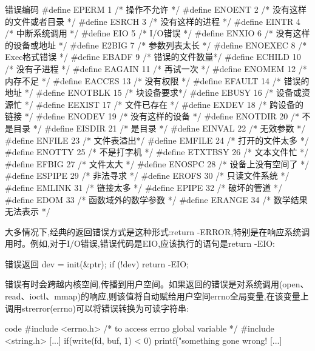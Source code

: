 \documentclass[lang=cn,newtx,10pt,scheme=chinese]{elegantbook}
\begin{document}
\begin{mycode}{错误编码}
#define  EPERM       1    /* 操作不允许 */
#define  ENOENT      2    /* 没有这样的文件或者目录 */
#define  ESRCH       3    /* 没有这样的进程 */
#define  EINTR       4    /* 中断系统调用 */
#define  EIO         5    /* I/O错误 */
#define  ENXIO       6    /* 没有这样的设备或地址 */
#define  E2BIG       7    /* 参数列表太长 */
#define  ENOEXEC     8    /* Exec格式错误 */
#define  EBADF       9    /* 错误的文件数量*/
#define  ECHILD      10   /* 没有子进程 */
#define  EAGAIN      11   /* 再试一次 */
#define  ENOMEM      12   /* 内存不足 */
#define  EACCES      13   /* 没有权限 */
#define  EFAULT      14   /* 错误的地址 */
#define  ENOTBLK     15   /* 块设备要求*/
#define  EBUSY       16   /* 设备或资源忙 */
#define  EEXIST      17   /* 文件已存在 */
#define  EXDEV       18   /* 跨设备的链接 */
#define  ENODEV      19   /* 没有这样的设备 */
#define  ENOTDIR     20   /* 不是目录 */
#define  EISDIR      21   /* 是目录 */
#define  EINVAL      22   /* 无效参数 */
#define  ENFILE      23   /* 文件表溢出*/
#define  EMFILE      24   /* 打开的文件太多 */
#define  ENOTTY      25   /* 不是打字机 */
#define  ETXTBSY     26   /* 文本文件忙 */
#define  EFBIG       27   /* 文件太大 */
#define  ENOSPC      28   /* 设备上没有空间了 */
#define  ESPIPE      29   /* 非法寻求 */
#define  EROFS       30   /* 只读文件系统 */
#define  EMLINK      31   /* 链接太多 */
#define  EPIPE       32   /* 破坏的管道 */
#define  EDOM        33   /* 函数域外的数学参数 */
#define  ERANGE      34   /* 数学结果无法表示 */
\end{mycode}

大多情况下,经典的返回错误方式是这种形式:return -ERROR,特别是在响应系统调用时。例如,对于I/O错误,错误代码是EIO,应该执行的语句是return -EIO:

\begin{mycode}{错误返回}
dev = init(&ptr);
if (!dev)
    return -EIO;
\end{mycode}

错误有时会跨越内核空间,传播到用户空间。如果返回的错误是对系统调用(open、read、ioctl、mmap)的响应,则该值将自动赋给用户空间errno全局变量,在该变量上调用strerror(errno)可以将错误转换为可读字符串:

\begin{mycode}{code}
#include <errno.h> /* to access errno global variable */
#include <string.h>
[...]
if(write(fd, buf, 1) < 0) {
    printf("something gone wrong! %
}
[...]
\end{mycode}
\end{document}
